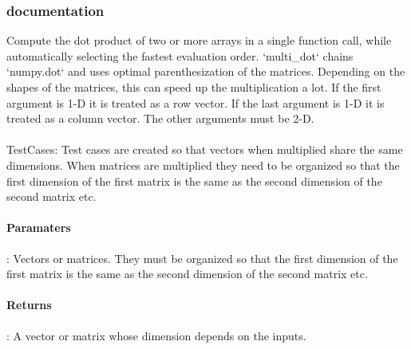 \documentclass[a4paper,11pt]{article}
\begin{document}
\subsubsection{documentation}
Compute the dot product of two or more arrays in a single function call, while automatically selecting the fastest evaluation order. `multi\_dot` chains `numpy.dot` and uses optimal parenthesization of the matrices. Depending on the shapes of the matrices, this can speed up the multiplication a lot. If the first argument is 1-D it is treated as a row vector. If the last argument is 1-D it is treated as a column vector. The other arguments must be 2-D.\\
\\
TestCases: Test cases are created so that vectors when multiplied share the same dimensions. When matrices are multiplied they need to be organized so that the first dimension of the first matrix is the same as the second dimension of the second matrix etc. 
\paragraph{Paramaters}: Vectors or matrices. They must be organized so that the first dimension of the first matrix is the same as the second dimension of the second matrix etc. 
\paragraph{Returns}: A vector or matrix whose dimension depends on the inputs. 
\end{document}

